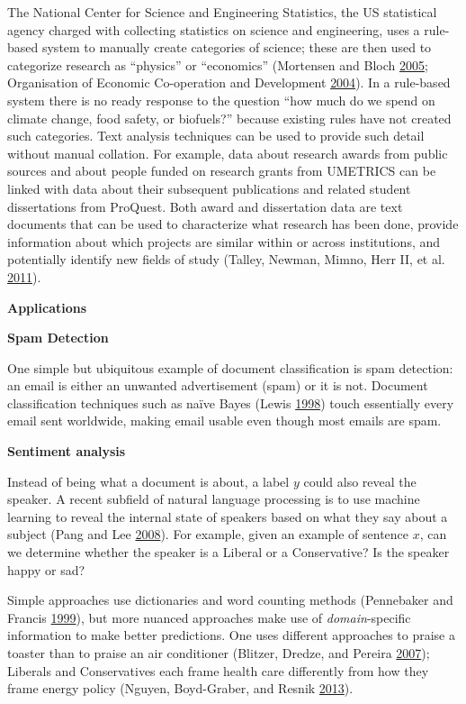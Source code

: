 \documentclass[]{krantz}
\begin{document}
The National Center for Science and Engineering Statistics, the US
statistical agency charged with collecting statistics on science and
engineering, uses a rule-based system to manually create categories of
science; these are then used to categorize research as ``physics'' or
``economics'' (Mortensen and Bloch
\protect\hyperlink{ref-oecd2005measurement}{2005}; Organisation of
Economic Co-operation and Development
\protect\hyperlink{ref-manual2004summary}{2004}). In a rule-based system
there is no ready response to the question ``how much do we spend on
climate change, food safety, or biofuels?'' because existing rules have
not created such categories. Text analysis techniques can be used to
provide such detail without manual collation. For example, data about
research awards from public sources and about people funded on research
grants from UMETRICS can be linked with data about their subsequent
publications and related student dissertations from ProQuest. Both award
and dissertation data are text documents that can be used to
characterize what research has been done, provide information about
which projects are similar within or across institutions, and
potentially identify new fields of study (Talley, Newman, Mimno, Herr
II, et al. \protect\hyperlink{ref-talley2011database}{2011}).

\textbf{Applications}

\textbf{Spam Detection}

One simple but ubiquitous example of document classification is spam
detection: an email is either an unwanted advertisement (spam) or it is
not. Document classification techniques such as naïve Bayes (Lewis
\protect\hyperlink{ref-lewis-05}{1998}) touch essentially every email
sent worldwide, making email usable even though most emails are spam.

\textbf{Sentiment analysis}

Instead of being what a document is about, a label \(y\) could also
reveal the speaker. A recent subfield of natural language processing is
to use machine learning to reveal the internal state of speakers based
on what they say about a subject (Pang and Lee
\protect\hyperlink{ref-pang-08}{2008}). For example, given an example of
sentence \(x\), can we determine whether the speaker is a Liberal or a
Conservative? Is the speaker happy or sad?

Simple approaches use dictionaries and word counting methods (Pennebaker
and Francis \protect\hyperlink{ref-pennebaker-99}{1999}), but more
nuanced approaches make use of \emph{domain}-specific information to
make better predictions. One uses different approaches to praise a
toaster than to praise an air conditioner (Blitzer, Dredze, and Pereira
\protect\hyperlink{ref-blitzer-07}{2007}); Liberals and Conservatives
each frame health care differently from how they frame energy policy
(Nguyen, Boyd-Graber, and Resnik
\protect\hyperlink{ref-nguyen-13:shlda}{2013}).
\end{document}
